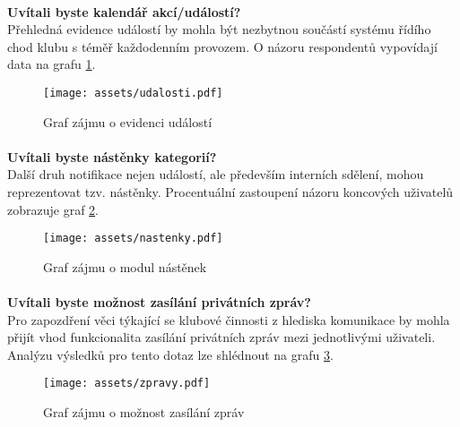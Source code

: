 \documentclass[11pt,oneside]{fithesis}
\begin{document}
                \paragraph*{}
                \noindent
                \textbf{Uvítali byste kalendář akcí/událostí?}\\
                Přehledná evidence událostí by mohla být nezbytnou součástí systému řídího chod klubu s téměř každodenním provozem. O názoru respondentů vypovídají data na grafu \ref{anal-akce}.\\
                \begin{figure}
                \centering
                \mbox{\texttt{[image: assets/udalosti.pdf]}}
                \caption{Graf zájmu o evidenci událostí \label{anal-akce}}
                \end{figure}

                \paragraph*{}
                \noindent
                \textbf{Uvítali byste nástěnky kategorií?}\\
                Další druh notifikace nejen událostí, ale především interních sdělení, mohou reprezentovat tzv. nástěnky. Procentuální zastoupení názoru koncových uživatelů zobrazuje graf \ref{anal-nastenky}.\\
                \begin{figure}
                \centering
                \mbox{\texttt{[image: assets/nastenky.pdf]}}
                \caption{Graf zájmu o modul nástěnek \label{anal-nastenky}}
                \end{figure}

                \paragraph*{}
                \noindent
                \textbf{Uvítali byste možnost zasílání privátních zpráv?}\\
                Pro zapozdření věci týkající se klubové činnosti z hlediska komunikace by mohla přijít vhod funkcionalita zasílání privátních zpráv mezi jednotlivými uživateli. Analýzu výsledků pro tento dotaz lze shlédnout na grafu \ref{anal-zpravy}.\\
                \begin{figure}
                \centering
                \mbox{\texttt{[image: assets/zpravy.pdf]}}
                \caption{Graf zájmu o možnost zasílání zpráv \label{anal-zpravy}}
                \end{figure}
\end{document}
